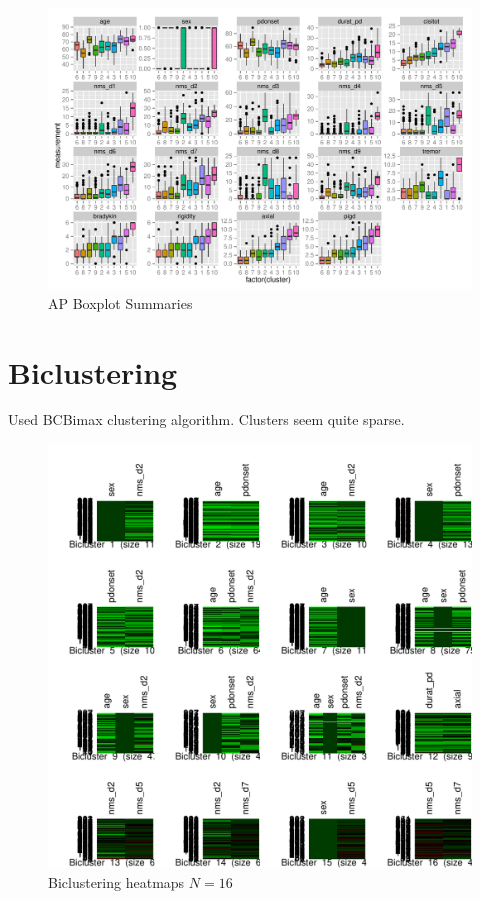 \documentclass[letterpaper,12pt]{article}
\begin{document}
\begin{figure}[h]
  \centering
  \includegraphics[width=\linewidth]{ap-summaries.pdf}
  \caption{AP Boxplot Summaries}
  \label{fig:ap-summaries}
\end{figure}

\section{Biclustering}

Used BCBimax clustering algorithm. Clusters seem quite sparse.

\begin{figure}[h]
  \centering
  \includegraphics[width=\linewidth]{biclust-heatmaps-16.pdf}
  \caption{Biclustering heatmaps $N = 16$}
  \label{fig:biclust-heatmaps-16}
\end{figure}
\end{document}

